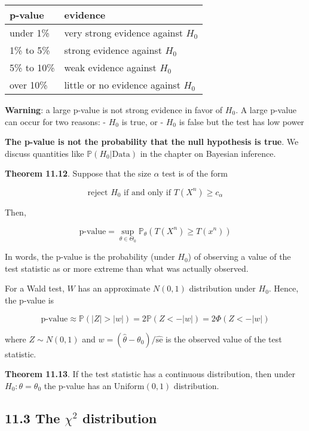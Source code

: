 \begin{table}[H]
\centering
\begin{tabular}{@{}ll@{}}
\toprule
p-value & evidence \\
\midrule
under 1\% & very strong evidence against \(H_{0}\) \\
1\% to 5\% & strong evidence against \(H_{0}\) \\
5\% to 10\% & weak evidence against \(H_{0}\) \\
over 10\% & little or no evidence against \(H_{0}\) \\
\bottomrule
\end{tabular}
\end{table}

\textbf{Warning}: a large p-value is not strong evidence in favor of
\(H_{0}\). A large p-value can occur for two reasons: - \(H_{0}\) is true,
or - \(H_{0}\) is false but the test has low power

\textbf{The p-value is not the probability that the null hypothesis is
true}. We discuss quantities like \(\mathbb{P}(H_{0} | \text{Data})\) in
the chapter on Bayesian inference.

\textbf{Theorem 11.12}. Suppose that the size \(\alpha\) test is of the
form

\[ \text{reject } H_{0} \text{ if and only if } T(X^{n}) \geq c_\alpha\]

Then,

\[ \text{p-value} = \sup_{\theta \in \Theta_{0}} \mathbb{P}_\theta \left(T(X^{n}) \geq T(x^{n}) \right)\]

In words, the p-value is the probability (under \(H_{0}\)) of observing a
value of the test statistic as or more extreme than what was actually
observed.

For a Wald test, \(W\) has an approximate \(N(0, 1)\) distribution under
\(H_{0}\). Hence, the p-value is

\[ \text{p-value} \approx \mathbb{P}(|Z| > |w|) = 2\mathbb{P}(Z < -|w|) = 2 \Phi(Z < -|w|) \]

where \(Z \sim N(0, 1)\) and
\(w = (\hat{\theta} - \theta_{0}) / \hat{\text{se}}\) is the observed
value of the test statistic.

\textbf{Theorem 11.13}. If the test statistic has a continuous
distribution, then under \(H_{0}: \theta = \theta_{0}\) the p-value has an
\(\text{Uniform}(0, 1)\) distribution.

\subsection*{\texorpdfstring{11.3 The \(\chi^{2}\)
distribution}{11.3 The \textbackslash chi^{2} distribution}}\label{chi2:dist}

